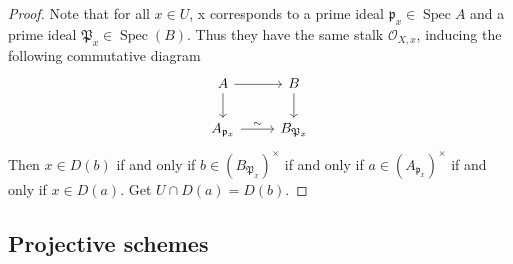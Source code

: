 \documentclass{ctexart}
\newcommand{\spec}{\operatorname{Spec}}
\begin{document}
\begin{proof}
    Note that for all $x\in U$, x corresponds to a prime ideal $\mathfrak{p}_{x}\in \spec A$ and a prime ideal $\mathfrak{P}_{x}\in \spec(B)$.
    Thus they have the same stalk $\mathcal{O}_{X, x}$, inducing the following commutative diagram
    \begin{equation*}
        \begin{tikzcd}
            A \arrow[r] \arrow[d] &
            B \arrow[d] \\
            A_{\mathfrak{p}_{x}} \arrow[r, "\sim"] &
            B_{\mathfrak{P}_{x}}
        \end{tikzcd}
    \end{equation*}
    Then $x\in D(b)$ if and only if $b\in (B_{\mathfrak{P}_{x}})^{\times}$ if and only if $a\in (A_{\mathfrak{p}_{x}})^{\times}$ if and only if $x\in D(a)$.
    Get $U \cap D(a) = D(b)$.
\end{proof}

\subsection{Projective schemes}
\label{subsection:Schemes_Projective_schemes}
\end{document}
